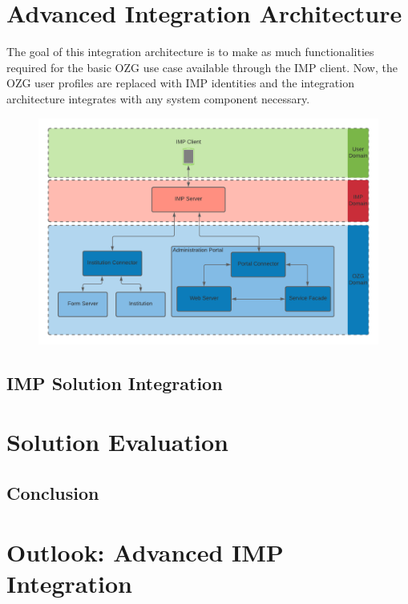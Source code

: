 \documentclass[
     12pt,         %
     a4paper,      %
     BCOR=10mm,version=first,     %
     DIV=14,version=first,        %
     ]{scrreprt}
\begin{document}



\chapter{Advanced Integration Architecture}

The goal of this integration architecture is to make as much functionalities required for the basic OZG use case available through the IMP client. Now, the OZG user profiles are replaced with IMP identities and the integration architecture integrates with any system component necessary.

\begin{figure}[h]
    \centering
    \includegraphics[scale=0.15]{Diagrams/Integration Architecture 2/Overview.png}
\end{figure}

\section{IMP Solution Integration}

\chapter{Solution Evaluation}

\section{Conclusion}

\chapter{Outlook: Advanced IMP Integration}


\printbibliography
\end{document}

